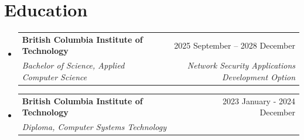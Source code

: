 \documentclass[letterpaper,11pt]{article}
\makeatletter
\newcommand{\resumeSubheading}[4]{
\vspace{-2pt}\item
\begin{tabular*}{0.97\textwidth}[t]{l@{\extracolsep{\fill}}r}
\textbf{#1} & #2 \\
\textit{\small#3} & \textit{\small #4} \\
\end{tabular*}\vspace{-7pt}
}
\newcommand{\resumeSubHeadingListStart}{\begin{itemize}[leftmargin=0.15in, label={}]}
\newcommand{\resumeSubHeadingListEnd}{\end{itemize}}
\makeatother
\begin{document}
\section{Education}
\resumeSubHeadingListStart
\resumeSubheading{British Columbia Institute of Technology}{2025 September – 2028 December}{Bachelor of Science, Applied Computer Science}{Network Security Applications Development Option}
\resumeSubheading{British Columbia Institute of Technology}{2023 January - 2024 December}{Diploma, Computer Systems Technology}{}
\resumeSubHeadingListEnd


\end{document}
